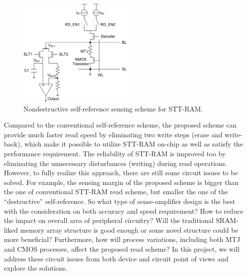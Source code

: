 \begin{figure}\centering \centering
\vspace{-18pt}
\includegraphics[width=0.5\textwidth]{./figure/self-ref.pdf}
\caption{Nondestructive self-reference sensing scheme for STT-RAM.}\label{self-ref}
\end{figure}

Compared to the conventional self-reference scheme\cite{Tanizaki06,Jeong03,Li:147723}, the proposed scheme can provide much faster read speed by eliminating two write steps (erase and write-back), which make it possible to utilize STT-RAM on-chip as well as satisfy the performance requirement. The reliability of STT-RAM is improved too by eliminating the unnecessary disturbances (writing) during read operations. However, to fully realize this approach, there are still some circuit issues to be solved. For example, the sensing margin of the proposed scheme is bigger than the one of conventional STT-RAM read scheme, but smaller the one of the ``destructive'' self-reference. So what type of sense-amplifier design is the best with the consideration on both accuracy and speed requirement? How to reduce the impact on overall area of peripheral circuitry? Will the traditional SRAM-liked memory array structure is good enough or some novel structure could be more beneficial? Furthermore, how will process variations, including both MTJ and CMOS processes, affect the proposed read scheme? In this project, we will address these circuit issues from both device and circuit point of views and explore the solutions.

